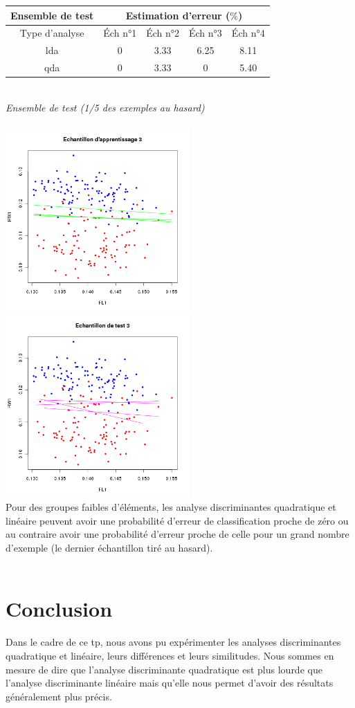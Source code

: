 \documentclass[a4paper, 10pt]{article}
\begin{document}
\begin{tabular}{|c|c|c|c|c|}
\hline
\textbf{Ensemble de test} & \multicolumn{4}{|c|}{Estimation d'erreur ($\%$)} \\
\hline
Type d'analyse & Éch n°1 & Éch n°2 & Éch n°3 & Éch n°4 \\
\hline
lda & 0 & 3.33 & 6.25 & 8.11 \\
\hline
qda & 0 & 3.33 & 0 & 5.40 \\
\hline
\end{tabular}\\
\textit{Ensemble de test (1/5 des exemples au hasard)}\\ \\
\includegraphics[height = 7cm, width = 7cm]{plots/exo2_a_30.png}
\includegraphics[height = 7cm, width = 7cm]{plots/exo2_a_31.png}\\
Pour des groupes faibles d'éléments, les analyse discriminantes quadratique et linéaire peuvent avoir une probabilité d'erreur de classification
proche de zéro ou au contraire avoir une probabilité d'erreur proche de celle pour un grand nombre d'exemple
(le dernier échantillon tiré au hasard).\\ \\

\section*{Conclusion}
Dans le cadre de ce tp, nous avons pu expérimenter les analyses discriminantes quadratique et linéaire, leurs différences et leurs similitudes.
Nous sommes en mesure de dire que l'analyse discriminante quadratique est plus lourde que l'analyse discriminante linéaire mais qu'elle
nous permet d'avoir des résultats généralement plus précis.
\end{document}
